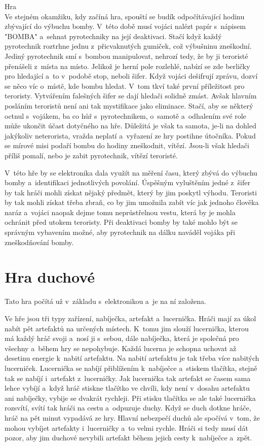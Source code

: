 Hra\\
Ve stejném okamžiku, kdy začíná hra, spouští se budík odpočítávající hodinu zbývající do výbuchu bomby. 
V~této době musí vojáci nalézt papír s~nápisem "BOMBA" a~sehnat pyrotechniky na její deaktivaci. 
Stačí když každý pyrotechnik roztrhne jednu z~přicvaknutých gumiček, což výbušninu zneškodní. 
Jediný pyrotechnik smí s~bombou manipulovat, nehrozí tedy, že by ji teroristé přenášeli z~místa na místo.
Jelikož je herní pole rozlehlé, nabízí se zde berličky pro hledající a~to v~podobě stop, neboli šifer. 
Když vojáci dešifrují zprávu, dozví se něco víc o~místě, kde bombu hledat. 
V~tom tkví také první příležitost pro teroristy. Vytvářením falešných šifer se dají hledači solidně zmást.
Avšak hlavním posláním teroristů není ani tak mystifikace jako eliminace. 
Stačí, aby se některý octnul s~vojákem, ba co hůř s~pyrotechnikem, o~samotě a~odhalením své role může ukončit účast dotyčného na hře. 
Důležitá je však ta samota, je-li na dohled jakýkoliv neterorista, vražda neplatí a~vyřazení ze hry postihne útočníka.
Pokud se mírové misi podaří bombu do hodiny zneškodnit, vítězí. 
Jsou-li však hledači příliš pomalí, nebo je zabit pyrotechnik, vítězí teroristé.

V~této hře by se elektronika dala využít na měření času, který zbývá do výbuchu bomby a~identifikaci jednotlivých povolání.
Úspěšným vyluštěním jedné z~šifer by tak hráči mohli získat nějaký předmět, který by jim poskytl výhodu.
Teroristi by tak mohli získat třeba zbraň, co by jim umožnila zabít víc jak jednoho člověka naráz a~vojáci naopak dejme tomu neprůstřelnou vestu, která by je mohla ochránit před utokem teroristy.
Při deaktivaci bomby by také mohlo být se správným vybavením možné, aby pyrotechnik na dálku naváděl vojáka při zneškodňování bomby.

\section{Hra duchové}
Tato hra počítá už v~základu s~elektronikou a~je na ní založena.

Ve hře jsou tři typy zařízení, nabíječka, artefakt a~lucernička.
Hráči mají za úkol nabít pět artefaktů na určených místech.
K~tomu jim slouží lucernička, kterou má každý hráč svoji a~nosí ji s~sebou, dále nabíječka, která je společná pro všechny a~během hry se nepohybuje.
Každá lucerna je schopna uchovat až desetinu energie k~nabití artefaktu. 
Na nabití artefaktu je tak třeba více nabitých lucerniček.
Lucernička se nabíjí přiblížením k~nabíječce a~stiskem tlačítka, stejně tak se nabíjí i~artefakt z~lucerničky.
Jak lucernička tak artefakt se časem sama lehce vybíjí a~když hráč stiskne tlačítko ve chvíli, kdy není v~dosahu artefaktu ani nabíječky, vybije se dvakrát rychleji.
Při stisku tlačítka se ale také lucernička rozsvítí, svítí tak hráči na cestu a~odpuzuje duchy.
Když se duch dotkne hráče, hráč na pět minut vypadává ze hry.
Hlavní nebezpečí duchů ale spočívá v~tom, že mohou vybíjet artefakty i~lucerničky a~to velmi rychle.
Hráči si tedy musí dát pozor, aby jim duchové nevybili artefakt během jejich cesty k~nabíječce a~zpět.

